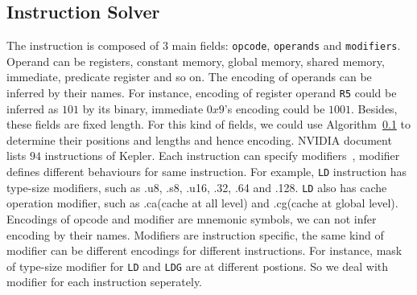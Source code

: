 \documentclass{sig-alternate-05-2015}
\begin{document}
\subsection{Instruction Solver}
The instruction is composed of $3$ main fields: {\tt opcode}, {\tt operands} and {\tt modifiers}.
Operand can be registers, constant memory, global  memory, shared memory, immediate, predicate register and so on.
The encoding of operands can be inferred by their names. For instance, encoding of register operand {\tt R5} could be
inferred as $101$ by its binary, immediate $0x9$'s encoding could be $1001$. Besides, these fields are fixed length. For this kind of
fields, we could use Algorithm~\ref{} to determine their positions and lengths and hence encoding.
NVIDIA document~\cite{cubin2015util} lists $94$ instructions of Kepler.
Each instruction can specify modifiers~\cite{ptx2015isa}, modifier defines different behaviours for same instruction. For example,
{\tt LD} instruction has type-size modifiers, such as .u8, .s8, .u16, .32, .64 and .128. {\tt LD} also has cache operation
modifier, such as .ca(cache at all level) and .cg(cache at global level).
Encodings of opcode and modifier are mnemonic symbols, we can not infer encoding by their names. Modifiers are instruction
specific, the same kind of modifier can be different encodings for different instructions. For instance, mask of type-size
modifier for {\tt LD} and {\tt LDG} are at different postions. So we deal with modifier for each instruction seperately.
\end{document}
